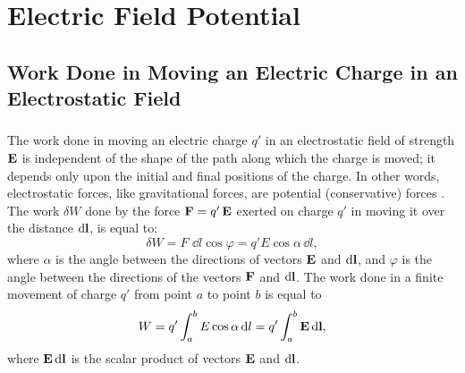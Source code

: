 





\chapter{Electric Field Potential}
\label{ch-16}

\section[Work in Moving Electric Charge]{Work Done in Moving an Electric Charge in an Electrostatic Field}
\label{sec-16.1}

\subsection{}\label{16.1.1} The work done in moving an electric charge $q'$ in an electrostatic field of strength $\vb{E}$  is independent of the shape of the path along which the charge is moved; it depends only upon the initial and final positions of the charge. In other words, electrostatic forces, like gravitational forces, are potential (conservative) forces . The work $\delta W$	 done by the force $\vb{F} = q'\, \vb{E}$ exerted on charge $q'$ in moving it over the distance $\dd \vb{l}$, is equal to:
\begin{equation*}%
\delta W = F \, \, \dd l \cos \varphi = q' E \cos \alpha\, \dd l,
\end{equation*}
where $\alpha$ is the angle between the directions of vectors $\vb{E}$ and $\dd \vb{l}$, and $\varphi $ is the angle between the directions of the vectors $\vb{F}$ and $\dd \vb{l}$. The work done in a finite movement of charge $q'$ from point $a$ to point $b$ is equal to
\begin{equation*}%
W = q' \int_{a}^{b} E \cos \alpha \,\dd l = q'  \int_{a}^{b} \vb{E} \,  \dd \vb{l},
\end{equation*}
where $\vb{E} \, \dd \vb{l}$ is the scalar product of vectors $\vb{E}$ and $\dd \vb{l}$.

